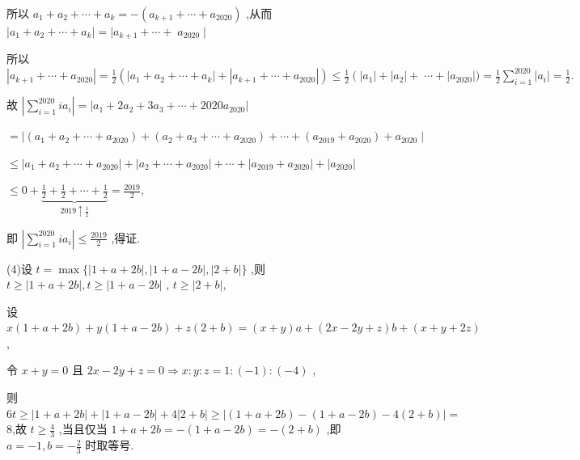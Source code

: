 \documentclass[10pt]{article}
\begin{document}
所以 \({a}_{1} + {a}_{2} + \cdots  + {a}_{k} =  - \left( {{a}_{k + 1} + \cdots  + {a}_{2020}}\right)\) ,从而 \(\left| {{a}_{1} + {a}_{2} + \cdots  + {a}_{k}}\right|  =  \mid  {a}_{k + 1} + \cdots  + \; {a}_{2020} \mid\)

所以 \(\left| {{a}_{k + 1} + \cdots  + {a}_{2020}}\right|  = \frac{1}{2}\left( {\left| {{a}_{1} + {a}_{2} + \cdots  + {a}_{k}}\right|  + \left| {{a}_{k + 1} + \cdots  + {a}_{2020}}\right| }\right)  \leq  \frac{1}{2}\left( {\left| {a}_{1}\right|  + \left| {a}_{2}\right|  + }\right. \; \cdots  + \left| {a}_{2020}\right| ) = \frac{1}{2}\mathop{\sum }\limits_{{i = 1}}^{{2020}}\left| {a}_{i}\right|  = \frac{1}{2}.\)

故 \(\left| {\mathop{\sum }\limits_{{i = 1}}^{{2020}}i{a}_{i}}\right|  = \left| {{a}_{1} + 2{a}_{2} + 3{a}_{3} + \cdots  + {2020}{a}_{2020}}\right|\)

\(=  \mid  \left( {{a}_{1} + {a}_{2} + \cdots  + {a}_{2020}}\right)  + \left( {{a}_{2} + {a}_{3} + \cdots  + {a}_{2020}}\right)  + \cdots  + \left( {{a}_{2019} + {a}_{2020}}\right)  + {a}_{2020} \mid\)

\(\leq  \left| {{a}_{1} + {a}_{2} + \cdots  + {a}_{2020}}\right|  + \left| {{a}_{2} + \cdots  + {a}_{2020}}\right|  + \cdots  + \left| {{a}_{2019} + {a}_{2020}}\right|  + \left| {a}_{2020}\right|\)

\(\leq  0 + \underset{{2019} \uparrow  \frac{1}{2}}{\underbrace{\frac{1}{2} + \frac{1}{2} + \cdots  + \frac{1}{2}}} = \frac{2019}{2},\)

即 \(\left| {\mathop{\sum }\limits_{{i = 1}}^{{2020}}i{a}_{i}}\right|  \leq  \frac{2019}{2}\) ,得证.

(4)设 \(t = \max \{ \left| {1 + a + {2b}}\right| ,\left| {1 + a - {2b}}\right| ,\left| {2 + b}\right| \}\) ,则 \(t \geq  \left| {1 + a + {2b}}\right| ,t \geq  \left| {1 + a - {2b}}\right|\) , \(t \geq  \left| {2 + b}\right| ,\)

设 \(x\left( {1 + a + {2b}}\right)  + y\left( {1 + a - {2b}}\right)  + z\left( {2 + b}\right)  = \left( {x + y}\right) a + \left( {{2x} - {2y} + z}\right) b + \left( {x + y + {2z}}\right)\) ,

令 \(x + y = 0\) 且 \({2x} - {2y} + z = 0 \Rightarrow  x : y : z = 1 : \left( {-1}\right)  : \left( {-4}\right)\) ,

则 \({6t} \geq  \left| {1 + a + {2b}}\right|  + \left| {1 + a - {2b}}\right|  + 4\left| {2 + b}\right|  \geq  \left| {\left( {1 + a + {2b}}\right)  - \left( {1 + a - {2b}}\right)  - 4\left( {2 + b}\right) }\right|  =\) 8,故 \(t \geq  \frac{4}{3}\) ,当且仅当 \(1 + a + {2b} =  - \left( {1 + a - {2b}}\right)  =  - \left( {2 + b}\right)\) ,即 \(a =  - 1,b =  - \frac{2}{3}\) 时取等号.
\end{document}
